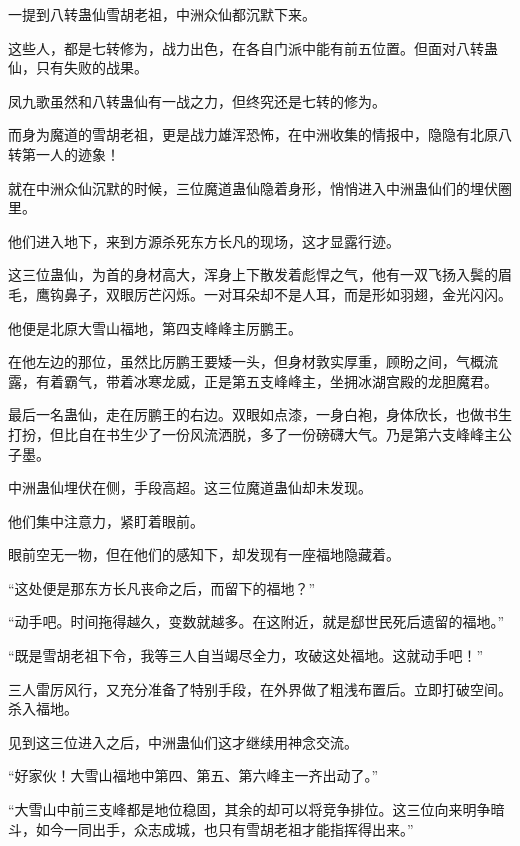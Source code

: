 
\begin{this_body}



一提到八转蛊仙雪胡老祖，中洲众仙都沉默下来。

这些人，都是七转修为，战力出色，在各自门派中能有前五位置。但面对八转蛊仙，只有失败的战果。

凤九歌虽然和八转蛊仙有一战之力，但终究还是七转的修为。

而身为魔道的雪胡老祖，更是战力雄浑恐怖，在中洲收集的情报中，隐隐有北原八转第一人的迹象！

就在中洲众仙沉默的时候，三位魔道蛊仙隐着身形，悄悄进入中洲蛊仙们的埋伏圈里。

他们进入地下，来到方源杀死东方长凡的现场，这才显露行迹。

这三位蛊仙，为首的身材高大，浑身上下散发着彪悍之气，他有一双飞扬入鬓的眉毛，鹰钩鼻子，双眼厉芒闪烁。一对耳朵却不是人耳，而是形如羽翅，金光闪闪。

他便是北原大雪山福地，第四支峰峰主厉鹏王。

在他左边的那位，虽然比厉鹏王要矮一头，但身材敦实厚重，顾盼之间，气概流露，有着霸气，带着冰寒龙威，正是第五支峰峰主，坐拥冰湖宫殿的龙胆魔君。

最后一名蛊仙，走在厉鹏王的右边。双眼如点漆，一身白袍，身体欣长，也做书生打扮，但比自在书生少了一份风流洒脱，多了一份磅礴大气。乃是第六支峰峰主公子墨。

中洲蛊仙埋伏在侧，手段高超。这三位魔道蛊仙却未发现。

他们集中注意力，紧盯着眼前。

眼前空无一物，但在他们的感知下，却发现有一座福地隐藏着。

“这处便是那东方长凡丧命之后，而留下的福地？”

“动手吧。时间拖得越久，变数就越多。在这附近，就是郄世民死后遗留的福地。”

“既是雪胡老祖下令，我等三人自当竭尽全力，攻破这处福地。这就动手吧！”

三人雷厉风行，又充分准备了特别手段，在外界做了粗浅布置后。立即打破空间。杀入福地。

见到这三位进入之后，中洲蛊仙们这才继续用神念交流。

“好家伙！大雪山福地中第四、第五、第六峰主一齐出动了。”

“大雪山中前三支峰都是地位稳固，其余的却可以将竞争排位。这三位向来明争暗斗，如今一同出手，众志成城，也只有雪胡老祖才能指挥得出来。”


\end{this_body}
